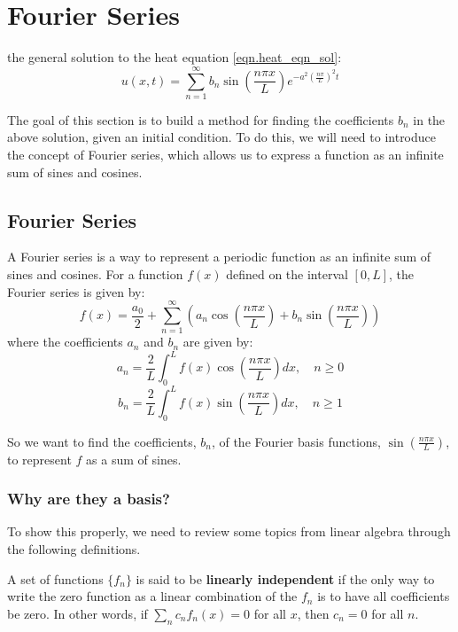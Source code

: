 \section{Fourier Series}\label{sec.fourier_series}

\recall the general solution to the heat equation \eqref{eqn.heat_eqn_sol}:
\[
u(x,t) = \sum_{n=1}^\infty b_n \sin\left(\frac{n \pi x}{L}\right) e^{-a^2 \left(\frac{n \pi}{L}\right)^2 t}
\]

The goal of this section is to build a method for finding the coefficients $b_n$ in the above solution, given an initial condition. To do this, we will need to introduce the concept of Fourier series, which allows us to express a function as an infinite sum of sines and cosines.

\subsection{Fourier Series}\label{subsec.fourier_series}
A Fourier series is a way to represent a periodic function as an infinite sum of sines and cosines. For a function $f(x)$ defined on the interval $[0, L]$, the Fourier series is given by:
\begin{equation*}\label{eqn.fourier_series}
f(x) = \frac{a_0}{2} + \sum_{n=1}^\infty \left( a_n \cos\left(\frac{n \pi x}{L}\right) + b_n \sin\left(\frac{n \pi x}{L}\right) \right)
\end{equation*}
where the coefficients $a_n$ and $b_n$ are given by:
\begin{equation*}\label{eqn.fourier_a_coeffs}
a_n = \frac{2}{L} \int_0^L f(x) \cos\left(\frac{n \pi x}{L}\right) dx, \quad n \geq 0
\end{equation*}
\begin{equation*}\label{eqn.fourier_b_coeffs}
b_n = \frac{2}{L} \int_0^L f(x) \sin\left(\frac{n \pi x}{L}\right) dx, \quad n \geq 1
\end{equation*}

So we want to find the coefficients, $b_n$, of the Fourier basis functions, $\sin\left(\frac{n \pi x}{L}\right)$, to represent $f$ as a sum of sines.
\subsubsection{Why are they a basis?}\label{subsubsec.fourier_basis}
To show this properly, we need to review some topics from linear algebra through the following definitions.

\begin{definition}\label{def.lin_indep}
    A set of functions $\{f_n\}$ is said to be \textbf{linearly independent} if the only way to write the zero function as a linear combination of the $f_n$ is to have all coefficients be zero. In other words, if $\sum_{n} c_n f_n(x) = 0$ for all $x$, then $c_n = 0$ for all $n$.
\end{definition}


